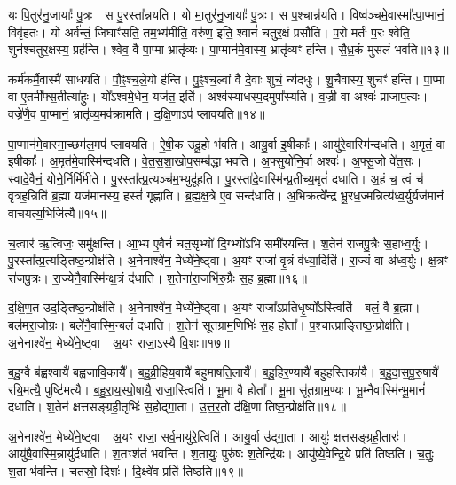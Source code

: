 यः पि॒तुर॑नु॒जायाः᳚ पु॒त्रः।
स पु॒रस्ता᳚न्नयति।
यो मा॒तुर॑नु॒जायाः᳚ पु॒त्रः।
स प॒श्चान्न॑यति।
विष्व॑ञ्चमे॒वास्मा᳚त्पा॒प्मानं॒ विवृ॑हतः।
यो अर्व॑न्तं॒ जिघाꣳ॑सति॒ तम॒भ्य॑मीति॒ वरु॑ण॒ इति॒ श्वानं॑ चतुर॒क्षं प्रसौ॑ति।
प॒रो मर्तः॑ प॒रः श्वेति॒ शुन॑श्चतुर॒क्षस्य॒ प्रह॑न्ति।
श्वेव॒ वै पा॒प्मा भ्रातृ॑व्यः।
पा॒प्मान॑मे॒वास्य॒ भ्रातृ॑व्यꣳ हन्ति।
सै॒ध्र॒कं मुस॑लं भवति॥१३॥\ip

कर्म॑कर्मै॒वास्मै॑ साधयति।
पौ॒ꣴ॒श्च॒ले॒यो ह॑न्ति।
पु॒ꣴ॒श्च॒ल्वां वै दे॒वाः शुचं॒ न्य॑दधुः।
शु॒चैवास्य॒ शुचꣳ॑ हन्ति।
पा॒प्मा वा ए॒तमी᳚फ्स॒तीत्या॑हुः।
यो᳚ऽश्वमे॒धेन॒ यज॑त॒ इति॑।
अश्व॑स्याधस्प॒दमु\-पा᳚स्यति।
व॒ज्री वा अश्वः॑ प्राजाप॒त्यः।
वज्रे॑णै॒व पा॒प्मानं॒ भ्रातृ॑व्य॒मव॑\-क्रामति।
द॒क्षि॒णाऽप॑ प्लावयति॥१४॥\ip

पा॒प्मान॑मे॒वास्मा॒च्छम॑ल॒मप॑ प्लावयति।
ऐ॒षी॒क उ॑दू॒हो भ॑वति।
आयु॒र्वा इ॒षीकाः᳚।
आयु॑रे॒वास्मि॑न्दधति।
अ॒मृतं॒ वा इ॒षीकाः᳚।
अ॒मृत॑मे॒वास्मि॑न्दधति।
वे॒त॒स॒शा॒खोप॒सम्ब॑द्धा भवति।
अ॒फ्सुयो॑नि॒र्वा अश्वः॑।
अ॒फ्सु॒जो वे॑त॒सः।
स्वादे॒वैनं॒ योने॒र्निर्मि॑मीते।
पु॒रस्ता᳚त्प्र॒त्यञ्च॑म॒भ्युदू॑हति।
पु॒रस्ता॑दे॒वास्मि॑न्प्र॒तीच्य॒मृतं॑ दधाति।
अ॒हं च॒ त्वं च॑ वृत्रह॒न्निति॑ ब्र॒ह्मा यज॑मानस्य॒ हस्तं॑ गृह्णाति।
ब्र॒ह्म॒क्ष॒त्रे ए॒व सन्द॑धाति।
अ॒भिक्रत्वे᳚न्द्र भू॒रध॒ज्मन्नित्य॑ध्व॒र्युर्यज॑मानं वाचयत्य॒भिजि॑त्यै॥१५॥\ip\anuvakamend[भ॒व॒ति॒ प्ला॒व॒य॒ति॒ मि॒मी॒ते॒ पञ्च॑ च]

च॒त्वार॑ ऋ॒त्विजः॒ समु॑क्षन्ति।
आ॒भ्य ए॒वैनं॑ चत॒सृभ्यो॑ दि॒ग्भ्यो॑\-ऽभि समी॑रयन्ति।
श॒तेन॑ राजपु॒त्रैः स॒हाध्व॒र्युः।
पु॒रस्ता᳚त्\-प्र॒त्यङ्तिष्ठ॒न्प्रोक्ष॑ति।
अ॒नेनाश्वे॑न॒ मेध्ये॑ने॒ष्ट्वा।
अ॒यꣳ राजा॑ वृ॒त्रं व॑ध्या॒दिति॑।
रा॒ज्यं वा अ॑ध्व॒र्युः।
क्ष॒त्रꣳ रा॑जपु॒त्रः।
रा॒ज्ये\-नै॒वास्मि॑न्क्ष॒त्रं द॑धाति।
श॒तेना॑रा॒जभि॑रु॒ग्रैः स॒ह ब्र॒ह्मा॥१६॥\ip

द॒क्षि॒ण॒त उद॒ङ्तिष्ठ॒न्प्रोक्ष॑ति।
अ॒नेनाश्वे॑न॒ मेध्ये॑ने॒ष्ट्वा।
अ॒यꣳ राजा᳚\-ऽप्रतिधृ॒ष्यो᳚\-ऽस्त्विति॑।
बलं॒ वै ब्र॒ह्मा।
बल॑मरा॒जोग्रः।
बले॑\-नै॒वा\-स्मि॒न्बलं॑ दधाति।
श॒तेन॑ सूतग्राम॒णिभिः॑ स॒ह होता᳚।
प॒श्चात्प्राङ्तिष्ठ॒न्प्रोक्ष॑ति।
अ॒नेनाश्वे॑न॒ मेध्ये॑ने॒ष्ट्वा।
अ॒यꣳ राजा॒\-ऽस्यै वि॒शः॥१७॥\ip

ब॒हु॒ग्वै ब॑ह्व॒श्वायै॑ बह्वजावि॒कायै᳚।
ब॒हु॒व्री॒हि॒य॒वायै॑ बहुमाष\-ति॒लायै᳚।
ब॒हु॒हि॒र॒ण्यायै॑ बहुह॒स्तिका॑यै।
ब॒हु॒दा॒स॒\-पू॒रु॒षायै॑ रयि॒मत्यै॒ पुष्टि॑मत्यै।
ब॒हु॒रा॒य॒स्पो॒षायै॒ राजा॒स्त्विति॑।
भू॒मा वै होता᳚।
भू॒मा सू॑तग्राम॒ण्यः॑।
भू॒म्नैवास्मि॑न्भू॒मानं॑ दधाति।
श॒तेन॑ क्षत्तसङ्ग्रही॒तृभिः॑ स॒होद्गा॒ता।
उ॒त्त॒र॒तो द॑क्षि॒णा तिष्ठ॒न्प्रोक्ष॑ति॥१८॥\ip

अ॒नेनाश्वे॑न॒ मेध्ये॑ने॒ष्ट्वा।
अ॒यꣳ राजा॒ सर्व॒मायु॑रे॒त्विति॑।
आयु॒र्वा उ॑द्गा॒ता।
आयुः॑ क्षत्तसङ्ग्रही॒तारः॑।
आयु॑षै॒वास्मि॒न्नायु॑र्द\-धाति।
श॒तꣳ\-श॑तं भवन्ति।
श॒तायुः॒ पुरु॑षः श॒तेन्द्रि॑यः।
आयु॑ष्ये॒वेन्द्रि॒ये प्रति॑ तिष्ठति।
च॒तुः॒ श॒ता भ॑वन्ति।
चत॑स्रो॒ दिशः॑।
दि॒क्ष्वे॑व प्रति॑ तिष्ठति॥१९॥\ip\anuvakamend[ब्र॒ह्मा वि॒श उ॑क्षति॒ दिश॒ एकं॑ च]

